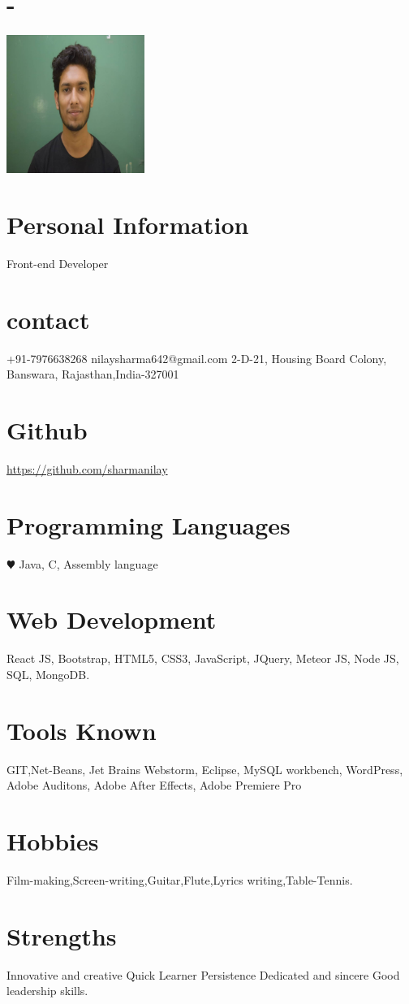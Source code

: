 \documentclass[english]{cv-style}     %
\begin{document}


\begin{aside}
\section{-}
\includegraphics[width=4.5cm]{22}
%
\section{Personal Information}
Front-end Developer
%
\section{contact}
+91-7976638268
nilaysharma642@gmail.com
2-D-21, Housing Board Colony,
Banswara, Rajasthan,India-327001
%
\section{Github}
\href{https://github.com/sharmanilay}{https://github.com/sharmanilay}
%
\section{Programming Languages}
{\color{red} $\varheartsuit$} Java, C, Assembly language
%
\section{Web Development}
React JS, Bootstrap, HTML5, CSS3, JavaScript, JQuery, Meteor JS, Node JS, SQL, MongoDB.
%
\section{Tools Known}
GIT,Net-Beans, Jet Brains Webstorm, Eclipse, MySQL workbench, WordPress, Adobe Auditons, Adobe After Effects, Adobe Premiere Pro
%
\section{Hobbies}
Film-making,Screen-writing,Guitar,Flute,Lyrics writing,Table-Tennis.
%
\section{Strengths}
Innovative and creative
Quick Learner
Persistence
Dedicated and sincere
Good leadership skills.
%
\end{aside}
\end{document}
